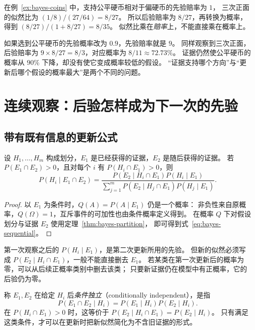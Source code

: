 \documentclass[UTF8,12pt,a4paper,fontset=fandol]{ctexart}
\begin{document}
在例~\ref{ex:bayes-coins} 中，支持公平硬币相对于偏硬币的先验赔率为 $1$，
三次正面的似然比为 $(1/8)/(27/64)=8/27$。
所以后验赔率为 $8/27$，再转换为概率，得到 $(8/27)/(1+8/27)=8/35$。
似然比乘在\emph{赔率}上，不能直接乘在概率上。

如果选到公平硬币的先验概率改为 $0.9$，先验赔率就是 $9$。
同样观察到三次正面，后验赔率为 $9\times8/27=8/3$，对应概率为 $8/11\approx72.73\%$。
证据仍然使公平硬币的概率从 $90\%$ 下降，却没有使它变成概率较低的假设。
“证据支持哪个方向”与“更新后哪个假设的概率最大”是两个不同的问题。

\section{连续观察：后验怎样成为下一次的先验}
\label{sec:bayes-sequential}

\subsection{带有既有信息的更新公式}

\begin{proposition}[保留既有条件的贝叶斯更新]
\label{prop:bayes-sequential}
设 $H_1,\ldots,H_m$ 构成划分，$E_1$ 是已经获得的证据，$E_2$ 是随后获得的证据。
若 $P(E_1\cap E_2)>0$，且对每个 $i$ 有 $P(H_i\cap E_1)>0$，则
\begin{equation}
  P(H_i\mid E_1\cap E_2)
  =\frac{P(E_2\mid H_i\cap E_1)P(H_i\mid E_1)}
  {\displaystyle\sum_{j=1}^{m}P(E_2\mid H_j\cap E_1)P(H_j\mid E_1)}.
  \label{eq:bayes-sequential}
\end{equation}
\end{proposition}
\begin{proof}
以 $E_1$ 为条件时，$Q(A)=P(A\mid E_1)$ 仍是一个概率：
非负性来自原概率，$Q(\Omega)=1$，互斥事件的可加性也由条件概率定义得到。
在概率 $Q$ 下对假设划分与证据 $E_2$ 使用定理~\ref{thm:bayes-partition}，
即可得到式~\eqref{eq:bayes-sequential}。
\end{proof}

第一次观察之后的 $P(H_i\mid E_1)$，是第二次更新所用的先验。
但新的似然必须写成 $P(E_2\mid H_i\cap E_1)$，一般不能直接删去 $E_1$。
若某类在第一次更新后的概率为零，可以从后续正概率类别中删去该类；
只要新证据仍在模型中有正概率，它的后验仍为零。

称 $E_1,E_2$ 在给定 $H_i$ 后\emph{条件独立}（conditionally independent），是指
\[
  P(E_1\cap E_2\mid H_i)
  =P(E_1\mid H_i)P(E_2\mid H_i).
\]
在 $P(H_i\cap E_1)>0$ 时，这等价于
$P(E_2\mid H_i\cap E_1)=P(E_2\mid H_i)$。
只有满足这类条件，才可以在更新时把新似然简化为不含旧证据的形式。
\end{document}
